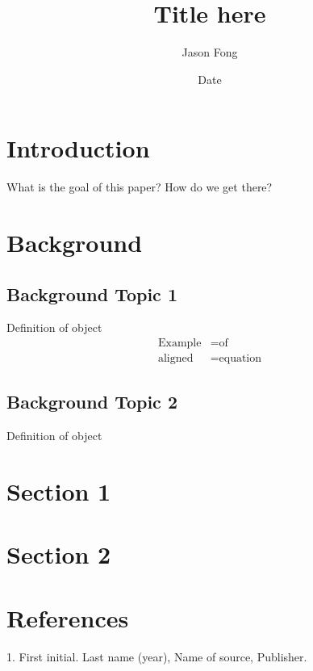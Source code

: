\documentclass[11pt]{article}
\title{Title here}
\author{Jason Fong}
\date{Date}
\begin{document}
\maketitle

\tableofcontents

\section{Introduction}

What is the goal of this paper? How do we get there?

\section{Background}

\subsection{Background Topic 1}

\begin{defn}
Definition of object
\begin{equation*}
\begin{split}
    \text{Example} &= \text{of}\\
    \text{aligned} &= \text{equation}
\end{split}
\end{equation*}
\end{defn}

\subsection{Background Topic 2}

\begin{defn}
Definition of object
\end{defn}

\section{Section 1}

\section{Section 2}

\section{References}

1. First initial. Last name (year), Name of source, Publisher.
\end{document}
